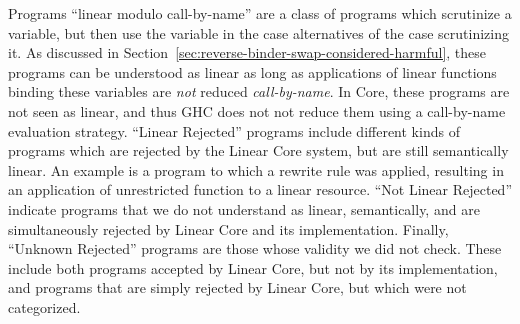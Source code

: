 \documentclass[acmsmall,review,anonymous]{acmart}
\newcommand{\incode}[1]{\lstinline{#1}}
\newcommand{\lolli}{\multimap}
\begin{document}
Programs ``linear modulo call-by-name'' are a class of programs
which scrutinize a variable, but then use the variable in the case
alternatives of the case scrutinizing it. As discussed in
Section~\ref{sec:reverse-binder-swap-considered-harmful}, these programs can be
understood as linear as long as applications of linear functions binding these
variables are \emph{not} reduced \emph{call-by-name}.
In Core, these programs are not seen as
linear, and thus GHC does not not reduce them using a call-by-name evaluation strategy.
%
``Linear Rejected'' programs include different kinds of programs which are
rejected by the Linear Core system, but are still semantically linear. An
example is a program to which a rewrite rule was applied, resulting in an
application of unrestricted function to a linear resource.
%
``Not Linear Rejected'' indicate programs that we do not understand as linear,
semantically, and are simultaneously rejected by Linear Core and its
implementation. %
%
Finally, ``Unknown Rejected'' programs are those whose validity we did not
check. These include both programs accepted by Linear Core, but not by its
implementation, and programs that are simply rejected by Linear Core, but which
were not categorized.
\end{document}
